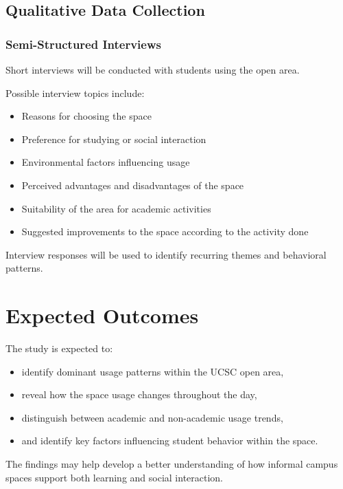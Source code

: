 \documentclass[12pt]{report}
\begin{document}
\section{Qualitative Data Collection}

\subsection{Semi-Structured Interviews}

Short interviews will be conducted with students using the open area.

Possible interview topics include:

\begin{itemize}
    \item Reasons for choosing the space
    \item Preference for studying or social interaction
    \item Environmental factors influencing usage
    \item Perceived advantages and disadvantages of the space
    \item Suitability of the area for academic activities
    \item Suggested improvements to the space according to the activity done
\end{itemize}

Interview responses will be used to identify recurring themes and behavioral patterns.

\chapter{Expected Outcomes}
The study is expected to:

\begin{itemize}
    \item identify dominant usage patterns within the UCSC open area,
    \item reveal how the space usage changes throughout the day,
    \item distinguish between academic and non-academic usage trends,
    \item and identify key factors influencing student behavior within the space.
\end{itemize}

The findings may help develop a better understanding of how informal campus spaces support both learning and social interaction.
\end{document}
